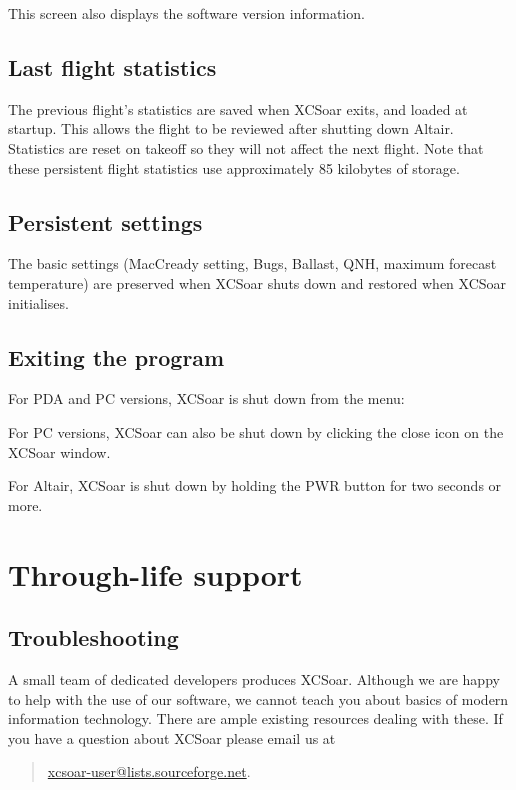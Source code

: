 \documentclass[a4paper,12pt]{refrep}
\begin{document}
This screen also displays the software version information.

\subsection*{Last flight statistics}

The previous flight's statistics are saved when XCSoar exits, and
loaded at startup.  This allows the flight to be reviewed after
shutting down Altair.  Statistics are reset on takeoff so they will
not affect the next flight.  Note that these persistent flight
statistics use approximately 85 kilobytes of storage.

\subsection*{Persistent settings}

The basic settings (MacCready setting, Bugs, Ballast, QNH, maximum
forecast temperature) are preserved when XCSoar shuts down and
restored when XCSoar initialises.  

\subsection*{Exiting the program}

For PDA and PC versions, XCSoar is shut down from the menu:
\begin{quote}
\blink{}\blink{}\blink{}
\end{quote}

For PC versions, XCSoar can also be shut down by clicking the close icon
on the XCSoar window.

For Altair, XCSoar is shut down by holding the PWR button for two seconds or
more.


\section{Through-life support}

\subsection*{Troubleshooting}

A small team of dedicated developers produces XCSoar.  Although we are
happy to help with the use of our software, we cannot teach you about
basics of modern information technology. There are ample existing
resources dealing with these.  If you have a question about XCSoar
please email us at 
\begin{quote}
\url{xcsoar-user@lists.sourceforge.net}.
\end{quote}
\end{document}

